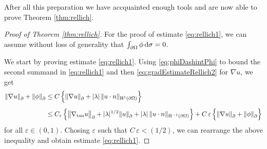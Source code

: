 After all this preparation we have accquainted enough tools and are now able to prove Theorem \ref{thm:rellich}.

\begin{proof}[Proof of Theorem \ref{thm:rellich}]
  For the proof of estimate \eqref{eq:rellich1}, we can assume without loss of generality that $\int_{\partial\Omega} \phi \, {\operatorname{d}\!{\sigma}} = 0$.

  We start by proving estimate \eqref{eq:rellich1}. 
  Using \eqref{eq:phiDashintPhi} to bound the second summand in \eqref{eq:rellich1} and then \eqref{eq:gradEstimateRellich2} for $\nabla u$, we get
  \begin{align*}
      \|\nabla u\|^{}_\partial + \|\phi\|^{}_\partial
      &\leq C\, \Big\{ \|\nabla u\|^{}_\partial + |\lambda|\, \|u \cdot n \|_{\mathrm{H}^1(\partial\Omega)} \Big\} \\[0.5em]
      &\leq C_\varepsilon\, \Big\{ \big\|\nabla_{\mathrm{tan}} u \big\|^{}_\partial + |\lambda|^{1/2} \|u\|^{}_\partial + |\lambda|\, \| u\cdot n\|_{\mathrm{H}^{-1}(\partial\Omega)} \Big\} 
      + C \,\varepsilon \,\Big\{ \|\nabla u\|^{}_\partial + \|\phi\|^{}_\partial \Big\}
  \end{align*}
  for all $\varepsilon \in (0,1)$.
  Chosing $\varepsilon$ such that $C\, \varepsilon < (1/2)$, we can rearrange the above inequality and obtain estimate \eqref{eq:rellich1}.


\end{proof}
